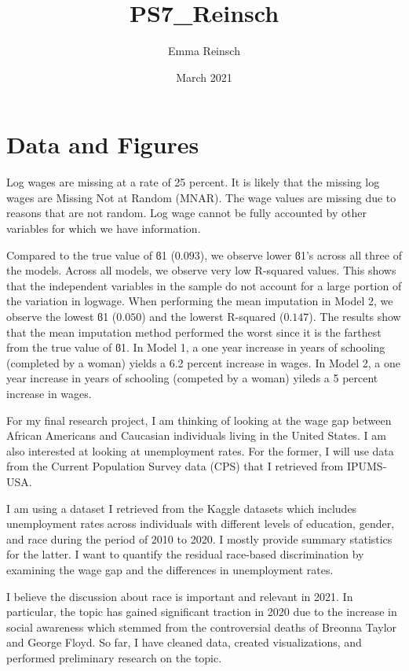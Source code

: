 \documentclass{article}
\title{PS7_Reinsch}
\author{Emma Reinsch}
\date{March 2021}
\begin{document}
\section{Data and Figures}


Log wages are missing at a rate of 25 percent. It is likely that the missing log wages are Missing Not at Random (MNAR). The wage values are missing due to reasons that are not random. Log wage cannot be fully accounted by other variables for which we have information.


Compared to the true value of ϐ1 ($0.093$), we observe lower ϐ1's across all three of the models. Across all models, we observe very low R-squared values. This shows that the independent variables in the sample do not account for a large portion of the variation in logwage. When performing the mean imputation in Model 2, we observe the lowest ϐ1 ($0.050$) and the lowerst R-squared ($0.147$). The results show that the mean imputation method performed the worst since it is the farthest from the true value of ϐ1. 
In Model 1, a one year increase in years of schooling (completed by a woman) yields a 6.2 percent increase in wages.
In Model 2, a one year increase in years of schooling (competed by a woman) yileds a 5 percent increase in wages.



For my final research project, I am thinking of looking at the wage gap between African Americans and Caucasian individuals living in the United States. I am also interested at looking at unemployment rates. For the former, I will use data from the Current Population Survey data (CPS) that I retrieved from IPUMS-USA.  

I am using a dataset I retrieved from the Kaggle datasets which includes unemployment rates across individuals with different levels of education, gender, and race during the period of 2010 to 2020. I mostly provide summary statistics for the latter. I want to quantify the residual race-based discrimination by examining the wage gap and the differences in unemployment rates.

I believe the discussion about race is important and relevant in 2021. In particular, the topic has gained significant traction in 2020 due to the increase in social awareness which stemmed from the controversial deaths of Breonna Taylor and George Floyd. So far, I have cleaned data, created visualizations, and performed preliminary research on the topic.
\end{document}
